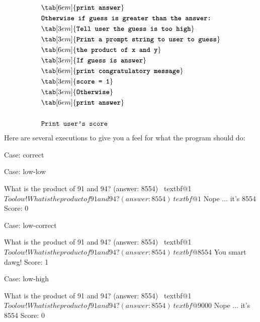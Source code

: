 \begin{align*}
&\tab[6em]{\textbf{\texttt{print answer}}}\\
&\textbf{\texttt{Otherwise if guess is greater than the answer:}}\\
&\tab[3em]{\textbf{\texttt{Tell user the guess is too high}}}\\
&\tab[3em]{\textbf{\texttt{Print a prompt string to user to guess}}}\\
&\tab[6em]{\textbf{\texttt{the product of x and y}}}\\
&\tab[3em]{\textbf{\texttt{If guess is answer}}}\\
&\tab[6em]{\textbf{\texttt{print congratulatory message}}}\\
&\tab[3em]{\textbf{\texttt{score = 1}}}\\
&\tab[3em]{\textbf{\texttt{Otherwise}}}\\
&\tab[6em]{\textbf{\texttt{print answer}}}\\\\
&\texttt{Print user's score}\\
\end{align*}
Here are several executions to give you a feel for what the program
should do:

Case: correct\\

Case: low-low\\
\begin{console}[commandchars=\~\@\$]
What is the product of 91 and 94? (answer: 8554) ~textbf@1$
Too low!
What is the product of 91 and 94? (answer: 8554) ~textbf@1$
Nope ... it's 8554
Score: 0 
\end{console}

Case: low-correct\\
\begin{console}[commandchars=\~\@\$]
What is the product of 91 and 94? (answer: 8554) ~textbf@1$
Too low!
What is the product of 91 and 94? (answer: 8554) ~textbf@8554$
You smart dawg!
Score: 1 
\end{console}

Case: low-high\\
\begin{console}[commandchars=\~\@\$]
What is the product of 91 and 94? (answer: 8554) ~textbf@1$
Too low!
What is the product of 91 and 94? (answer: 8554) ~textbf@9000$
Nope ... it's 8554
Score: 0
\end{console}


